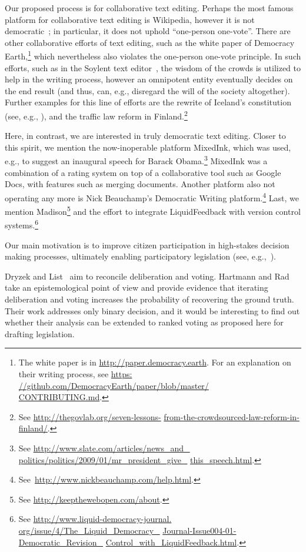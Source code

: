 \documentclass{llncs}
\begin{document}
Our proposed process is for collaborative text editing.
Perhaps the most famous platform for collaborative text editing is Wikipedia, however it is not democratic~\cite{black2008wikipedia}; in particular, it does not uphold ``one-person one-vote''.
There are other collaborative efforts of text editing, such as the white paper of Democracy Earth,\footnote{The white paper is in \url{http://paper.democracy.earth}. For an explanation on their writing process, see \url{https:} \url{//github.com/DemocracyEarth/paper/blob/master/} \url{CONTRIBUTING.md}.}
which nevertheless also violates the one-person one-vote principle.
In such efforts, such as in the Soylent text editor~\cite{soylent},
the wisdom of the crowds is utilized to help in the writing process,
however an omnipotent entity eventually decides on the end result (and thus, can, e.g., disregard the will of the society altogether).
%
Further examples for this line of efforts are the rewrite of Iceland's constitution (see, e.g., \cite[page 18]{aitamurto2012crowdsourcing}),
and the traffic law reform in Finland.\footnote{See \url{http://thegovlab.org/seven-lessons-} \url{from-the-crowdsourced-law-reform-in-finland/}.}

Here, in contrast, we are interested in truly democratic text editing.
Closer to this spirit, we mention the now-inoperable platform MixedInk, which was used, e.g., to suggest an inaugural speech for Barack Obama.\footnote{See \url{http://www.slate.com/articles/news_and_} \url{politics/politics/2009/01/mr_president_give_} \url{this_speech.html}.}
MixedInk was a combination of a rating system on top of a collaborative tool such as Google Docs, with features such as merging documents.
Another platform also not operating any more is Nick Beauchamp's Democratic Writing platform.\footnote{See~\url{http://www.nickbeauchamp.com/help.html}.}
Last, we mention Madison\footnote{See \url{http://keepthewebopen.com/about}.}
and the effort to integrate LiquidFeedback with version control systems.\footnote{See \url{http://www.liquid-democracy-journal.} \url{org/issue/4/The_Liquid_Democracy_} \url{Journal-Issue004-01-Democratic_Revision_} \url{Control_with_LiquidFeedback.html}.}

Our main motivation is to improve citizen participation in high-stakes decision making processes, ultimately enabling participatory legislation (see, e.g.,~\cite{ochoa2008relationship}).

Dryzek and List~\cite{dryzek2003social} aim to reconcile deliberation and voting.  Hartmann and Rad~\cite{hartmann2018voting} take an epistemological point of view and provide evidence that iterating deliberation and voting increases the probability of recovering the ground truth.  Their work addresses only binary decision, and it would be interesting to find out whether their analysis can be extended to ranked voting as proposed here for drafting legislation.
\end{document}
